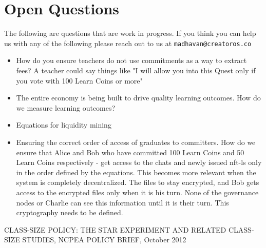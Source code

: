 \documentclass{article}
\begin{document}
  \section{Open Questions}
    The following are questions that are work in progress. If you think you can help us with any of the following please reach out to us at \texttt{madhavan@creatoros.co}
    \begin{itemize}
      \item How do you ensure teachers do not use commitments as a way to extract fees? A teacher could say things like "I will allow you into  this Quest only if you vote with 100 Learn Coins or more"
      \item The entire economy is being built to drive quality learning outcomes. How do we measure learning outcomes?
      \item Equations for liquidity mining
      \item Ensuring the correct order of access of graduates to committers. How do we ensure that Alice and Bob who have committed 100 Learn Coins and 50 Learn Coins respectively - get access to the chats and newly issued nft-ls only in the order defined by the equations. This becomes more relevant when the system is completely decentralized. The files to stay encrypted, and Bob gets access to the encrypted files only when it is his turn. None of the governance nodes or Charlie can see this information until it is their turn. This cryptography needs to be defined.
    \end{itemize}

  \begin{thebibliography}{9}
     CLASS-SIZE POLICY: THE STAR EXPERIMENT AND RELATED CLASS-SIZE STUDIES, NCPEA	POLICY	BRIEF, October 2012
  \end{thebibliography}
\end{document}
